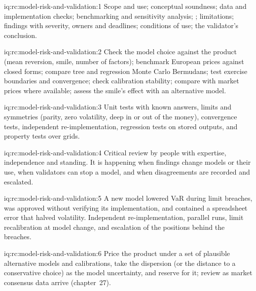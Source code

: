 \begin{solution}{iq:rc:model-risk-and-validation:1}
Scope and use; conceptual soundness; data and implementation checks; benchmarking and sensitivity
analysis; ; limitations; findings with severity, owners and deadlines; conditions of
use; the validator's conclusion.
\end{solution}

\begin{solution}{iq:rc:model-risk-and-validation:2}
Check the model choice against the product (mean reversion, smile, number of factors); benchmark
European prices against closed forms; compare tree and regression Monte Carlo Bermudans; test
exercise boundaries and convergence; check calibration stability; compare with market prices where
available; assess the smile's effect with an alternative model.
\end{solution}

\begin{solution}{iq:rc:model-risk-and-validation:3}
Unit tests with known answers, limits and symmetries (parity, zero volatility, deep in or out of the
money), convergence tests, independent re-implementation, regression tests on stored outputs, and
property tests over grids.
\end{solution}

\begin{solution}{iq:rc:model-risk-and-validation:4}
Critical review by people with expertise, independence and standing. It is happening when findings
change models or their use, when validators can stop a model, and when disagreements are recorded and
escalated.
\end{solution}

\begin{solution}{iq:rc:model-risk-and-validation:5}
A new model lowered VaR during limit breaches, was approved without verifying its implementation,
and contained a spreadsheet error that halved volatility. Independent re-implementation, parallel runs,
limit recalibration at model change, and escalation of the positions behind the breaches.
\end{solution}

\begin{solution}{iq:rc:model-risk-and-validation:6}
Price the product under a set of plausible alternative models and calibrations, take the dispersion
(or the distance to a conservative choice) as the model uncertainty, and reserve for it; review as
market consensus data arrive (chapter~27).
\end{solution}
